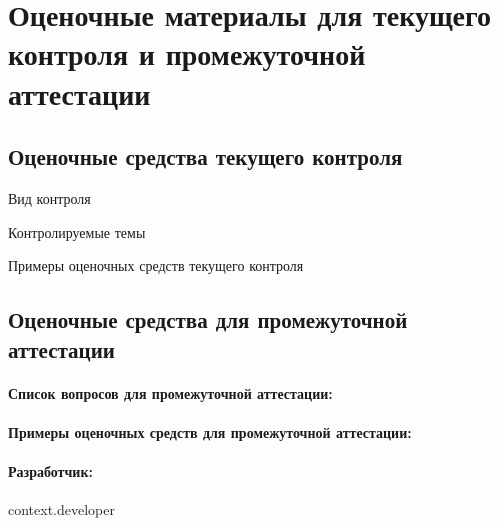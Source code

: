 \documentclass[12pt]{scrartcl}
\begin{document}
\section{Оценочные материалы для текущего контроля и
промежуточной аттестации}


\subsection{Оценочные средства текущего контроля}

Вид контроля

Контролируемые темы

Примеры оценочных средств текущего контроля

\subsection{Оценочные средства для промежуточной аттестации}

\paragraph{Список вопросов для промежуточной аттестации:}

\paragraph{Примеры оценочных средств для промежуточной аттестации:}

\par
\paragraph{\normalfont Разработчик:} {{context.developer}} %
\end{document}
